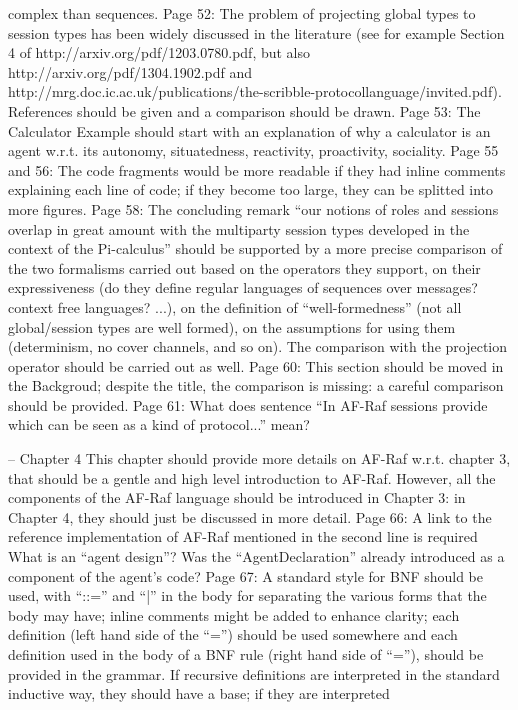 \documentclass{article}
\newenvironment{them}{\noindent\begingroup\color{blue}}{\endgroup\par}
\begin{document}
\begin{them}
complex than sequences.
Page 52:
The problem of projecting global types to session types has been widely discussed in the literature
(see for example Section 4 of http://arxiv.org/pdf/1203.0780.pdf, but also
http://arxiv.org/pdf/1304.1902.pdf and http://mrg.doc.ic.ac.uk/publications/the-scribble-protocollanguage/invited.pdf).
References should be given and a comparison should be drawn.
Page 53:
The Calculator Example should start with an explanation of why a calculator is an agent w.r.t. its
autonomy, situatedness, reactivity, proactivity, sociality.
Page 55 and 56:
The code fragments would be more readable if they had inline comments explaining each line of
code; if they become too large, they can be splitted into more figures.
Page 58:
The concluding remark “our notions of roles and sessions overlap in great amount with the
multiparty session types developed in the context of the Pi-calculus” should be supported by a more
precise comparison of the two formalisms carried out based on the operators they support, on their
expressiveness (do they define regular languages of sequences over messages? context free
languages? ...), on the definition of “well-formedness” (not all global/session types are well formed),
on the assumptions for using them (determinism, no cover channels, and so on). The comparison
with the projection operator should be carried out as well.
Page 60:
This section should be moved in the Backgroud; despite the title, the comparison is missing: a careful
comparison should be provided.
Page 61:
What does sentence “In AF-Raf sessions provide which can be seen as a kind of protocol...” mean?
\end{them}
-- Chapter 4
This chapter should provide more details on AF-Raf w.r.t. chapter 3, that should be a gentle and high
level introduction to AF-Raf. However, all the components of the AF-Raf language should be
introduced in Chapter 3: in Chapter 4, they should just be discussed in more detail.
Page 66:
A link to the reference implementation of AF-Raf mentioned in the second line is required
What is an “agent design”? Was the “AgentDeclaration” already introduced as a component of the
agent's code?
Page 67:
A standard style for BNF should be used, with “::=” and “|” in the body for separating the various
forms that the body may have; inline comments might be added to enhance clarity; each definition
(left hand side of the “=”) should be used somewhere and each definition used in the body of a BNF
rule (right hand side of “=”), should be provided in the grammar. If recursive definitions are
interpreted in the standard inductive way, they should have a base; if they are interpreted
\end{document}
